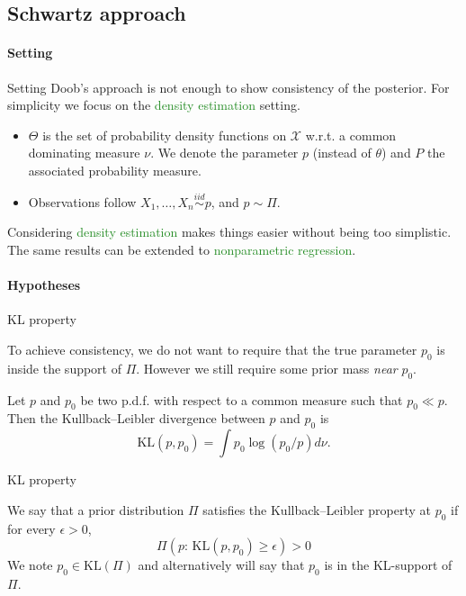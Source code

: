 \subsection{Schwartz approach}

\paragraph{Setting}



{Setting}
Doob's approach is not enough to show consistency of the posterior. For simplicity we focus on the \textcolor{forestgreen}{density estimation} setting.
\begin{itemize}
 \item $\Theta$ is the set of probability density functions on $\mathcal{X}$ w.r.t. a common dominating measure $\nu$. We denote the parameter $p$ (instead of $\theta$) and $P$ the associated probability measure. 
 \item Observations follow $X_1, \dots, X_n \overset{iid}{\sim} p$, and $p\sim \Pi$.
 \end{itemize}
 

Considering  \textcolor{forestgreen}{density estimation} makes things easier  without being too simplistic. The same results can be extended to  \textcolor{forestgreen}{nonparametric regression}.  




\paragraph{Hypotheses}



{KL property}

To achieve consistency, we do not want to require that the true parameter $p_0$ is  \textcolor{orange2}{inside} the support of $\Pi$. However we still require \textcolor{orange2}{some prior mass \emph{near} $p_0$}. 
\begin{definition}
Let $p$ and $p_0$ be two p.d.f. with respect to a common measure such that $p_0 \ll p$. Then the Kullback--Leibler divergence between $p$ and $p_0$ is 
$$
\text{KL}(p,p_0) = \int p_0 \log(p_0/p) d\nu.
$$ 
\end{definition}







{KL property}

\begin{definition}[KL property]
We say that a prior distribution $\Pi$ satisfies the \textcolor{orange2}{Kullback--Leibler property} at $p_0$ if for every $\epsilon>0$, 
$$
\Pi(p:\,\text{KL}(p,p_0)\geq \epsilon) >0 
$$
We note $p_0\in \text{KL}(\Pi)$ and alternatively will say that $p_0$ is in the KL-support of $\Pi$.
\end{definition}

